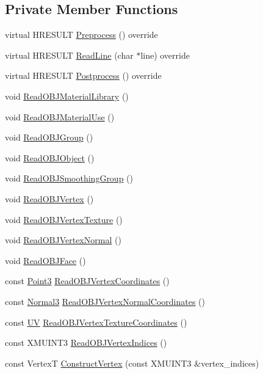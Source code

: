 \subsection*{Private Member Functions}
\begin{DoxyCompactItemize}
\item 
virtual H\+R\+E\+S\+U\+LT \hyperlink{classmage_1_1_o_b_j_reader_adf891ce9b0634f10d6698b88ed3f8d16}{Preprocess} () override
\item 
virtual H\+R\+E\+S\+U\+LT \hyperlink{classmage_1_1_o_b_j_reader_a66080ff8e84d61c421e455ae9bf63414}{Read\+Line} (char $\ast$line) override
\item 
virtual H\+R\+E\+S\+U\+LT \hyperlink{classmage_1_1_o_b_j_reader_a99bc512fd79fb46a688869db6edf5704}{Postprocess} () override
\item 
void \hyperlink{classmage_1_1_o_b_j_reader_abc1f67436e50230bd2071b2dc31a4689}{Read\+O\+B\+J\+Material\+Library} ()
\item 
void \hyperlink{classmage_1_1_o_b_j_reader_aa4c73ff0e5e3de40cacbebc189037802}{Read\+O\+B\+J\+Material\+Use} ()
\item 
void \hyperlink{classmage_1_1_o_b_j_reader_a8159620b12d426073581202fee022662}{Read\+O\+B\+J\+Group} ()
\item 
void \hyperlink{classmage_1_1_o_b_j_reader_afc3f17024a006cce3b7869ca8c6a8f07}{Read\+O\+B\+J\+Object} ()
\item 
void \hyperlink{classmage_1_1_o_b_j_reader_a2dd830c506ffbfbcd932b9bf75a35c56}{Read\+O\+B\+J\+Smoothing\+Group} ()
\item 
void \hyperlink{classmage_1_1_o_b_j_reader_a70fc61d8cc14dc8efbd73a88188cc511}{Read\+O\+B\+J\+Vertex} ()
\item 
void \hyperlink{classmage_1_1_o_b_j_reader_ae0dfedd81f23e6e15725e9ef02dd3034}{Read\+O\+B\+J\+Vertex\+Texture} ()
\item 
void \hyperlink{classmage_1_1_o_b_j_reader_aa9ef2ced0ad787b13818722c7dfa0636}{Read\+O\+B\+J\+Vertex\+Normal} ()
\item 
void \hyperlink{classmage_1_1_o_b_j_reader_a647cd7683007f351096702924ce46a3b}{Read\+O\+B\+J\+Face} ()
\item 
const \hyperlink{structmage_1_1_point3}{Point3} \hyperlink{classmage_1_1_o_b_j_reader_ace593a436953e8583b5b4cd721893c44}{Read\+O\+B\+J\+Vertex\+Coordinates} ()
\item 
const \hyperlink{structmage_1_1_normal3}{Normal3} \hyperlink{classmage_1_1_o_b_j_reader_a2be022b43cf2ad848c7a2d013b16e5f2}{Read\+O\+B\+J\+Vertex\+Normal\+Coordinates} ()
\item 
const \hyperlink{structmage_1_1_u_v}{UV} \hyperlink{classmage_1_1_o_b_j_reader_a9b1a38d60a9d1c5c9095394fa37375e6}{Read\+O\+B\+J\+Vertex\+Texture\+Coordinates} ()
\item 
const X\+M\+U\+I\+N\+T3 \hyperlink{classmage_1_1_o_b_j_reader_a2e807f8c18874135888d1e99d4d08d90}{Read\+O\+B\+J\+Vertex\+Indices} ()
\item 
const VertexT \hyperlink{classmage_1_1_o_b_j_reader_aa899d5657f913d488cc748fd49ccee60}{Construct\+Vertex} (const X\+M\+U\+I\+N\+T3 \&vertex\+\_\+indices)
\end{DoxyCompactItemize}
